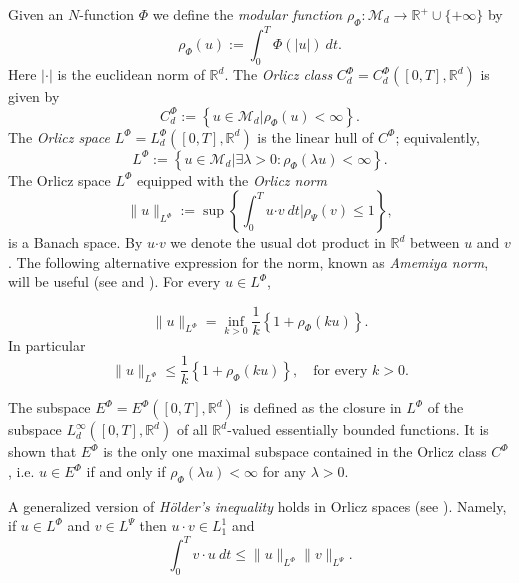 \documentclass[twoside]{article}
\theoremstyle{remark}
\newcommand{\orlnor}{\|_{L^{\Phi}}}
\newcommand{\lphi}{L^{\Phi}}
\newcommand{\lpsi}{L^{\Psi}}
\newcommand{\ephi}{E^{\Phi}}
\newcommand{\claseor}{C^{\Phi}}
\renewcommand{\b}[1]{\boldsymbol{#1}}
\newcommand{\rr}{\mathbb{R}}
\renewcommand{\leq}{\leqslant}
\begin{document}
Given  an $N$-function $\Phi$ we define the \emph{modular function} 
$\rho_{\Phi}:\mathcal{M}_d\to \mathbb{R}^+\cup\{+\infty\}$ by
\[\rho_{\Phi}(u):= \int_0^T \Phi(|u|)\ dt.\]
Here $|\cdot|$ is the euclidean norm of $\mathbb{R}^d$.
The \emph{Orlicz class} $C_d^{\Phi}=C_d^{\Phi}([0,T],\rr^d)$  is given  by
\begin{equation}\label{claseOrlicz}
  C^{\Phi}_d:=\left\{u\in \mathcal{M}_d | \rho_{\Phi}(u)< \infty \right\}.
\end{equation}
The \emph{Orlicz space} $\lphi=L^{\Phi}_d([0,T],\rr^d)$ is the linear hull of $\claseor$;
equivalently,
\begin{equation}\label{espacioOrlicz}
\lphi:=\left\{ u\in \mathcal{M}_d | \exists \lambda>0: \rho_{\Phi}(\lambda u) < \infty   \right\}.
\end{equation}
  The Orlicz space $\lphi$ equipped with the \emph{Orlicz norm}
\[
\|  u  \orlnor:=\sup \left\{  \int_0^T u\b{\cdot} v\ dt \big| \rho_{\Psi}(v)\leq 1\right\},
\]
is a Banach space. By $u\b{\cdot} v$ we denote the usual dot product in $\mathbb{R}^{d}$ between $u$ and $v$.
The following alternative expression for the norm, known as \emph{Amemiya norm},     will  be useful (see \cite[Thm. 10.5]{KR} and \cite{hudzik2000amemiya}). For every $u\in\lphi$,

\begin{equation}\label{amemiya}
\|u\orlnor=\inf\limits_{k>0}\frac{1}{k}\left\{1+\rho_{\Phi}(ku)\right\}.
\end{equation}
In particular
\begin{equation}\label{amemiya-ine}
\|u\orlnor\leq \frac{1}{k}\left\{1+\rho_{\Phi}(ku)\right\},\quad\text{for every } k>0.
\end{equation}


The subspace $\ephi=\ephi([0,T],\rr^d)$ is defined as the closure in $\lphi$ of the subspace $L^{\infty}_d([0,T],\rr^d)$ of all $\mathbb{R}^d$-valued essentially bounded functions. It is shown that  $\ephi$ is the only one maximal subspace contained in the Orlicz class $\claseor$, i.e.
$u\in\ephi$ if and only if $\rho_{\Phi}(\lambda u)<\infty$ for any $\lambda>0$.

A generalized version of \emph{H\"older's inequality} holds in Orlicz spaces (see \cite[Th. 9.3]{KR}). Namely, if $u\in\lphi$ and $v\in\lpsi$ then $u\cdot v\in L_1^1$ and
\begin{equation}\label{holder}
\int_0^Tv\cdot u\ dt\leq \|u\orlnor\|v\|_{L^{\Psi}}.
\end{equation}
\end{document}

